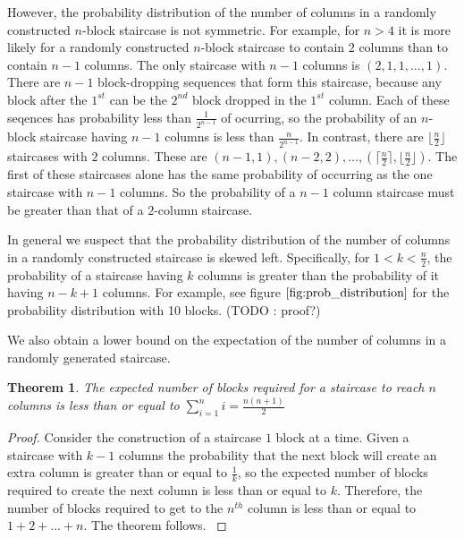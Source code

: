 \documentclass[12pt]{amsart}
\newtheorem{theorem}{Theorem}[section]
\begin{document}
However, the probability distribution of the number of columns in a randomly constructed $n$-block staircase is not symmetric. For example, for $n > 4$ it is more likely for a randomly constructed $n$-block staircase to contain $2$ columns than to contain $n-1$ columns. The only staircase with $n-1$ columns is $(2, 1, 1, \ldots, 1)$. There are $n-1$ block-dropping sequences that form this staircase, because any block after the $1^{st}$ can be the $2^{nd}$ block dropped in the $1^{st}$ column. Each of these seqences has probability less than $\frac{1}{2^{n-1}}$ of ocurring, so the probability of an $n$-block staircase having $n-1$ columns is less than $\frac{n}{2^{n-1}}$.  In contrast, there are $\lfloor \frac{n}{2} \rfloor$ staircases with $2$ columns. These are $(n-1, 1), (n-2, 2), \ldots, (\lceil \frac{n}{2} \rceil, \lfloor \frac{n}{2} \rfloor)$. The first of these staircases alone has the same probability of occurring  as the one staircase with $n-1$ columns. So the probability of a $n-1$ column staircase must be greater than that of a $2$-column staircase.

In general we suspect that the probability distribution of the number of columns in a randomly constructed staircase is skewed left. Specifically, for $1 < k < \frac{n}{2}$, the probability of a staircase having $k$ columns is greater than the probability of it having $n-k+1$ columns. For example, see figure $\ref{fig:prob_distribution}$ for the probability distribution with 10 blocks. (TODO : proof?)

We also obtain a lower bound on the expectation of the number of columns in a randomly generated staircase.

\begin{theorem}
\label{lower_bound}
The expected number of blocks required for a staircase to reach $n$ columns is less than or equal to $\displaystyle\sum_{i=1}^{n}i = \frac{n(n+1)}{2}$
\end{theorem}

\begin{proof}
Consider the construction of a staircase $1$ block at a time. Given a staircase with $k-1$ columns the probability that the next block will create an extra column is greater than or equal to $\frac{1}{k}$, so the expected number of blocks required to create the next column is less than or equal to $k$. Therefore, the number of blocks required to get to the $n^{th}$ column is less than or equal to $1 + 2 + \ldots + n$. The theorem follows.
\label{thm:lower_bound}
\end{proof}
\end{document}
